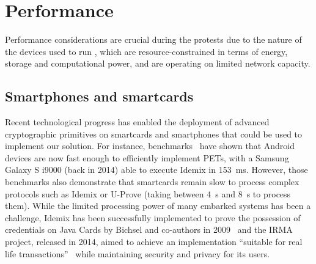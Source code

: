 \section{Performance}%
\label{PerformanceAnalysis}


Performance considerations are crucial during the protests due to the nature of 
the devices used to run \CROCUS, which are resource-constrained in terms of 
energy, storage and computational power, and are operating on limited network 
capacity. 

\subsection{Smartphones and smartcards}

Recent technological progress has enabled the deployment of advanced 
cryptographic primitives on smartcards and smartphones that could be used to 
implement our solution.
For instance, benchmarks~\cite{Benchmarking} have shown that Android devices 
are now fast enough to efficiently implement \acp{PET}, with a Samsung Galaxy S 
i9000 (back in 2014) able to execute Idemix in \SI{153}{\milli\second}. 
However, those benchmarks also demonstrate that smartcards remain slow to 
process complex protocols such as Idemix or U-Prove (taking between 
\SI{4}{\second} and \SI{8}{\second} to process them). While the limited 
processing power of many embarked systems has been a challenge, Idemix has been 
successfully implemented to prove the possession of credentials on Java Cards 
by Bichsel and co-authors in 2009~\cite{Bichsel} and the IRMA project, released 
in 2014, aimed to achieve an implementation ``suitable for real life 
transactions''~\cite{IRMA} while maintaining security and privacy for its 
users. 


